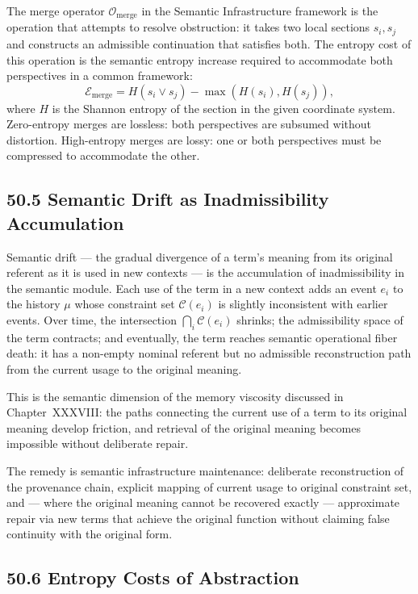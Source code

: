\documentclass[12pt,letterpaper]{article}
\theoremstyle{remark}
\begin{document}
The merge operator $\mathcal{O}_{\mathrm{merge}}$ in the Semantic
Infrastructure framework is the operation that attempts to resolve
obstruction: it takes two local sections $s_i, s_j$ and constructs
an admissible continuation that satisfies both. The entropy cost of
this operation is the semantic entropy increase required to
accommodate both perspectives in a common framework:
\[
\mathcal{E}_{\mathrm{merge}} = H(s_i \vee s_j) - \max(H(s_i), H(s_j)),
\]
where $H$ is the Shannon entropy of the section in the given
coordinate system. Zero-entropy merges are lossless: both
perspectives are subsumed without distortion. High-entropy merges
are lossy: one or both perspectives must be compressed to
accommodate the other.

\subsection{50.5 Semantic Drift as Inadmissibility Accumulation}

Semantic drift — the gradual divergence of a term's meaning from
its original referent as it is used in new contexts — is the
accumulation of inadmissibility in the semantic module. Each use of
the term in a new context adds an event $e_i$ to the history $\mu$
whose constraint set $\mathcal{C}(e_i)$ is slightly inconsistent
with earlier events. Over time, the intersection
$\bigcap_i \mathcal{C}(e_i)$ shrinks; the admissibility space of
the term contracts; and eventually, the term reaches semantic
operational fiber death: it has a non-empty nominal referent but
no admissible reconstruction path from the current usage to the
original meaning.

This is the semantic dimension of the memory viscosity discussed
in Chapter~XXXVIII: the paths connecting the current use of a term
to its original meaning develop friction, and retrieval of the
original meaning becomes impossible without deliberate repair.

The remedy is semantic infrastructure maintenance: deliberate
reconstruction of the provenance chain, explicit mapping of current
usage to original constraint set, and — where the original meaning
cannot be recovered exactly — approximate repair via new terms that
achieve the original function without claiming false continuity with
the original form.

\subsection{50.6 Entropy Costs of Abstraction}
\end{document}
